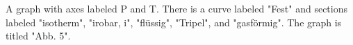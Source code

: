 A graph with axes labeled P and T. There is a curve labeled "Fest" and sections labeled "isotherm", "irobar, i", "flüssig", "Tripel", and "gasförmig". The graph is titled "Abb. 5".